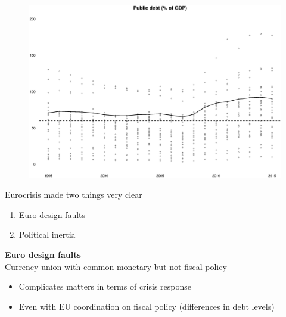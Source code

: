 \documentclass{beamer}
\begin{document}
\begin{frame}
  \begin{figure}
    \includegraphics[scale=.3]{public_debt2.eps}
  \end{figure}
\end{frame}

\begin{frame}
  Eurocrisis made two things very clear
  \begin{enumerate}    
    \item Euro design faults
    \item Political inertia
  \end{enumerate}
\end{frame}

\begin{frame}
  \textbf{Euro design faults}\\
  Currency union with common monetary but not fiscal policy
  \begin{itemize}
    \item Complicates matters in terms of crisis response
    \item Even with EU coordination on fiscal policy (differences in debt levels)
  \end{itemize}  
\end{frame}
\end{document}
